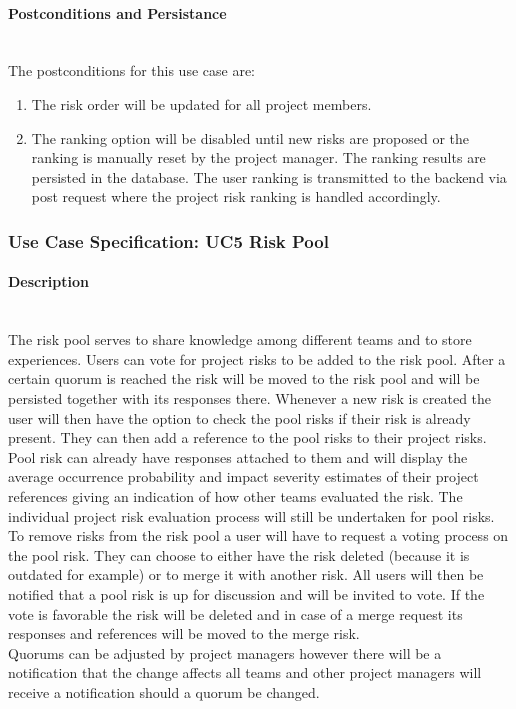 \paragraph*{Postconditions and Persistance}\mbox{}\\
The postconditions for this use case are:
\begin{enumerate}
	\vspace{-3mm}
	\setlength\itemsep{-1em}
	\item The risk order will be updated for all project members.
	\item The ranking option will be disabled until new risks are proposed or the ranking is manually reset by the project manager.
\noindent	
The ranking results are persisted in the database. The user ranking is transmitted to the backend via post request where the project risk ranking is handled accordingly.
\end{enumerate}


\newpage
\subsubsection{Use Case Specification: \ac{UC}5 Risk Pool}
\label{sec:domainBbf}

\paragraph*{Description}\mbox{}\\
The risk pool serves to share knowledge among different teams and to store experiences. Users can vote for project risks to be added to the risk pool. After a certain quorum is reached the risk will be moved to the risk pool and will be persisted together with its responses there. Whenever a new risk is created the user will then have the option to check the pool risks if their risk is already present. They can then add a reference to the pool risks to their project risks. Pool risk can already have responses attached to them and will display the average occurrence probability and impact severity estimates of their project references giving an indication of how other teams evaluated the risk. The individual project risk evaluation process will still be undertaken for pool risks. \\
To remove risks from the risk pool a user will have to request a voting process on the pool risk. They can choose to either have the risk deleted (because it is outdated for example) or to merge it with another risk. All users will then be notified that a pool risk is up for discussion and will be invited to vote. If the vote is favorable the risk will be deleted and in case of a merge request its responses and references will be moved to the merge risk. \\
Quorums can be adjusted by project managers however there will be a notification that the change affects all teams and other project managers will receive a notification should a quorum be changed. 

